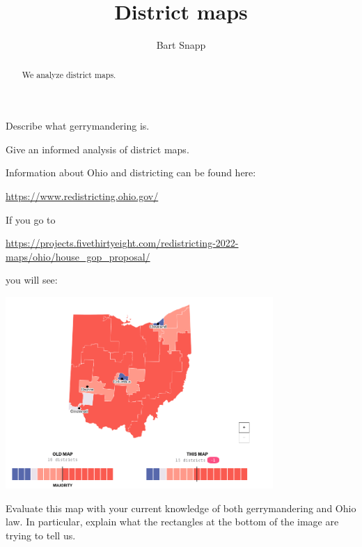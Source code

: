 \documentclass[noauthor,nooutcomes,hints,handout,12pt]{ximera}
\title{District maps}
\author{Bart Snapp}
\begin{document}
\begin{abstract}
  We analyze district maps.
\end{abstract}
\maketitle

\begin{listOutcomes}
\item Describe what gerrymandering is.
\item Give an informed analysis of district maps.
\end{listOutcomes}

Information about Ohio and districting can be found here:
\begin{center}
  \url{https://www.redistricting.ohio.gov/}
\end{center}


\mynewpage






\begin{question}
    If you go to
  \begin{center}
  \url{https://projects.fivethirtyeight.com/redistricting-2022-maps/ohio/house_gop_proposal/}
  \end{center}
  you will see:
  \begin{center}
    \includegraphics[width=4in]{houseGOP.png}
  \end{center}
  Evaluate this map with your current knowledge of both gerrymandering
  and Ohio law. In particular, explain what the rectangles at the
  bottom of the image are trying to tell us.
\end{question}




\mynewpage
\end{document}
